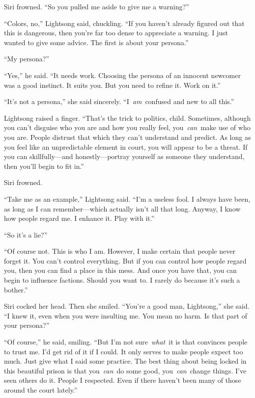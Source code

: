 Siri frowned. “So you pulled me aside to give me a warning?”

“Colors, no,” Lightsong said, chuckling. “If you haven’t already figured out that this is dangerous, then you’re far too dense to appreciate a warning. I just wanted to give some advice. The first is about your persona.”

“My persona?”

“Yes,” he said. “It needs work. Choosing the persona of an innocent newcomer was a good instinct. It suits you. But you need to refine it. Work on it.”

“It’s not a persona,” she said sincerely. “I~\textit{am}~confused and new to all this.”

Lightsong raised a finger. “That’s the trick to politics, child. Sometimes, although you can’t disguise who you are and how you really feel, you~\textit{can}~make use of who you are. People distrust that which they can’t understand and predict. As long as you feel like an unpredictable element in court, you will appear to be a threat. If you can skillfully—and honestly—portray yourself as someone they understand, then you’ll begin to fit in.”

Siri frowned.

“Take me as an example,” Lightsong said. “I’m a useless fool. I always have been, as long as I can remember—which actually isn’t all that long. Anyway, I know how people regard me. I enhance it. Play with it.”

“So it’s a lie?”

“Of course not. This is who I am. However, I make certain that people never forget it. You can’t control everything. But if you can control how people regard you, then you can find a place in this mess. And once you have that, you can begin to influence factions. Should you want to. I rarely do because it’s such a bother.”

Siri cocked her head. Then she smiled. “You’re a good man, Lightsong,” she said. “I knew it, even when you were insulting me. You mean no harm. Is that part of your persona?”

“Of course,” he said, smiling. “But I’m not sure~\textit{what}~it is that convinces people to trust me. I’d get rid of it if I could. It only serves to make people expect too much. Just give what I said some practice. The best thing about being locked in this beautiful prison is that you~\textit{can}~do some good, you~\textit{can}~change things. I’ve seen others do it. People I respected. Even if there haven’t been many of those around the court lately.”


